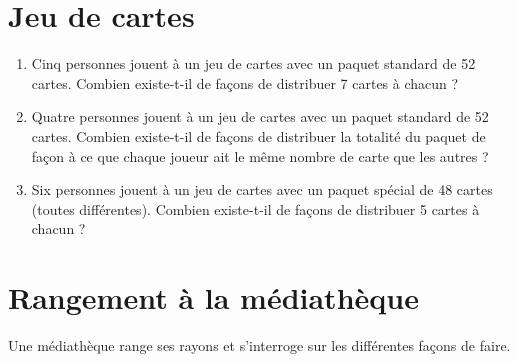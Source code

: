 \documentclass[a4paper,11pt]{article}
\begin{document}
\section{Jeu de cartes}

\begin{enumerate}
\item Cinq personnes jouent à un jeu de cartes avec un paquet standard de 52 cartes. Combien existe-t-il de façons de distribuer 7 cartes à chacun ?

\item Quatre personnes jouent à un jeu de cartes avec un paquet standard de 52 cartes. Combien existe-t-il de façons de distribuer la totalité du paquet de façon à ce que chaque joueur ait le même nombre de carte que les autres ?

\item Six personnes jouent à un jeu de cartes avec un paquet spécial de 48 cartes (toutes différentes). Combien existe-t-il de façons de distribuer 5 cartes à chacun ?
\end{enumerate}

\section{Rangement à la médiathèque}

Une médiathèque range ses rayons et s'interroge sur les différentes façons de faire.
\end{document}
